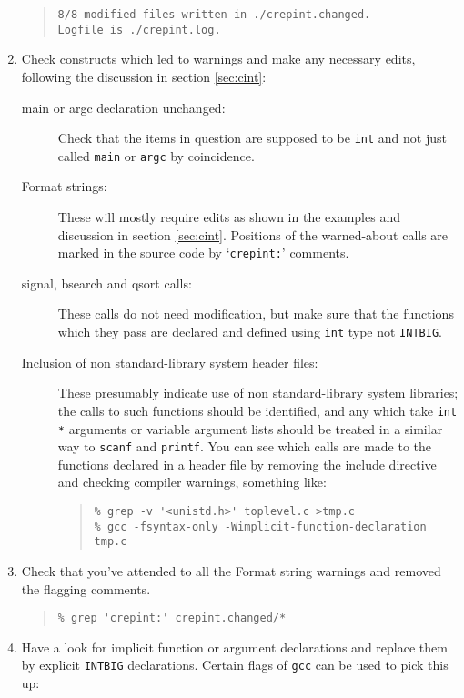 \documentclass[twoside,11pt]{article}
\renewcommand{\_}{\texttt{\symbol{95}}}
\newcommand{\file}[1]{{\tt #1}}
\newcommand{\cc}[1]{{\tt #1}}
\newenvironment{squote}{\begin{quote}\begin{small}}{\end{small}\end{quote}}
\begin{document}
\begin{enumerate}
\begin{squote}
\begin{verbatim}
8/8 modified files written in ./crepint.changed.
Logfile is ./crepint.log.
\end{verbatim}
\end{squote}
%
\item
Check constructs which led to warnings and make any necessary
edits, following the discussion in section \ref{sec:cint}:
\begin{description}
%
\item[main or argc declaration unchanged:]
Check that the items in question are supposed to be \cc{int} and not
just called \cc{main} or \cc{argc} by coincidence.
\item[Format strings:]
These will mostly require edits as shown in the examples
and discussion in section \ref{sec:cint}.
Positions of the warned-about calls are marked in the source code
by `\cc{crepint:}' comments.
%
\item[signal, bsearch and qsort calls:]
These calls do not need modification, but make sure that the functions
which they pass are declared and defined
using \cc{int} type not \cc{INT\_BIG}.
%
\item[Inclusion of non standard-library system header files:]
These presumably indicate use of non standard-library system libraries;
the calls to such functions should be identified, and any which take
\cc{int *} arguments or variable argument lists should be treated in
a similar way to \cc{scanf} and \cc{printf}.
You can see which calls are made to the functions declared in a header file
by removing the include directive and checking compiler warnings,
something like:
\begin{squote}
\begin{verbatim}
% grep -v '<unistd.h>' toplevel.c >tmp.c
% gcc -fsyntax-only -Wimplicit-function-declaration tmp.c
\end{verbatim}
\end{squote}
\end{description}
%
\item
Check that you've attended to all the Format string warnings and removed
the flagging comments.
\begin{squote}
\begin{verbatim}
% grep 'crepint:' crepint.changed/*
\end{verbatim}
\end{squote}
%
\item
Have a look for implicit function or argument declarations
and replace them by explicit \cc{INT\_BIG} declarations.
Certain flags of \file{gcc} can be used to pick this up:

\end{enumerate}
\end{document}
